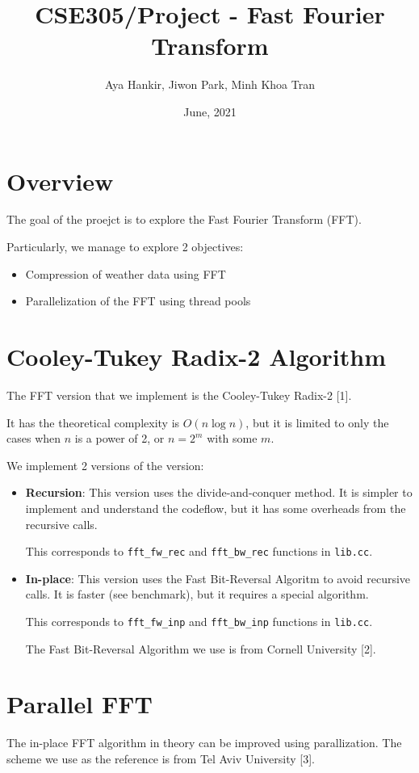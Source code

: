 \documentclass[10pt, letterpaper]{article}
\title{CSE305/Project - Fast Fourier Transform}
\author{Aya Hankir, Jiwon Park, Minh Khoa Tran}
\date{June, 2021}
\begin{document}
\maketitle

\section{Overview}
The goal of the proejct is to explore the Fast Fourier Transform (FFT).

Particularly, we manage to explore 2 objectives:
\begin{itemize}
	\item Compression of weather data using FFT
	\item Parallelization of the FFT using thread pools
\end{itemize}


\section{Cooley-Tukey Radix-2 Algorithm}
The FFT version that we implement is the Cooley-Tukey Radix-2 [1].

It has the theoretical complexity is $O(n \log n)$, but it is limited to
only the cases when $n$ is a power of 2, or $n = 2^m$ with some $m$.

We implement 2 versions of the version:
\begin{itemize}
	\item \textbf{Recursion}: This version uses the divide-and-conquer
		method. It is simpler to implement and understand the
		codeflow, but it has some overheads from the recursive
		calls.

		This corresponds to \texttt{fft\_fw\_rec} and
		\texttt{fft\_bw\_rec} functions in \texttt{lib.cc}.

	\item \textbf{In-place}: This version uses the Fast Bit-Reversal
		Algoritm to avoid recursive calls. It is faster (see
		benchmark), but it requires a special algorithm.

		This corresponds to \texttt{fft\_fw\_inp} and
		\texttt{fft\_bw\_inp} functions in \texttt{lib.cc}.

		The Fast Bit-Reversal Algorithm we use is from Cornell
		University [2].
\end{itemize}


\section{Parallel FFT}
The in-place FFT algorithm in theory can be improved using parallization.
The scheme we use as the reference is from Tel Aviv University [3].
\end{document}

